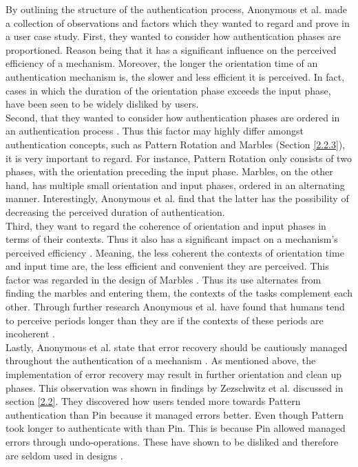 By outlining the structure of the authentication process, Anonymous et al. \cite{anonymous} made a collection of observations and factors which they wanted to regard and prove in a user case study. First, they wanted to consider how authentication phases are proportioned. Reason being that it has a significant influence on the perceived efficiency of a mechanism. Moreover, the longer the orientation time of an authentication mechanism is, the slower and less efficient it is perceived. In fact, cases in which the duration of the orientation phase exceeds the input phase, have been seen to be widely disliked by users. \\

Second, that they wanted to consider how authentication phases are ordered in an authentication process \cite{anonymous}. Thus this factor may highly differ amongst authentication concepts, such as Pattern Rotation and Marbles \cite{Marbles} (Section \ref{2.2.3}), it is very important to regard. For instance, Pattern Rotation only consists of two phases, with the orientation preceding the input phase. Marbles, on the other hand, has multiple small orientation and input phases, ordered in an alternating manner. Interestingly, Anonymous et al. \cite{anonymous} find that the latter has the possibility of decreasing the perceived duration of authentication. \\

Third, they want to regard the coherence of orientation and input phases in terms of their contexts. Thus it also has a significant impact on a mechanism's perceived efficiency \cite{anonymous}. Meaning, the less coherent the contexts of orientation time and input time are, the less efficient and convenient they are perceived. This factor was regarded in the design of Marbles \cite{Marbles}. Thus its use alternates from finding the marbles and entering them, the contexts of the tasks complement each other. Through further research Anonymous et al. \cite{anonymous} have found that humans tend to perceive periods longer than they are if the contexts of these periods are incoherent \cite{anonymous,perception}.\\

Lastly, Anonymous et al. \cite{anonymous} state that error recovery should be cautiously managed throughout the authentication of a mechanism \cite{anonymous}. As mentioned above, the implementation of error recovery may result in further orientation and clean up phases. This observation was shown in findings by Zezschwitz et al. \cite{PatternWild} discussed in section \ref{2.2}. They discovered how users tended more towards Pattern authentication than Pin because it managed errors better. Even though Pattern took longer to authenticate with than Pin. This is because Pin allowed managed errors through undo-operations. These have shown to be disliked and therefore are seldom used in designs \cite{PatternWild, anonymous}. 

